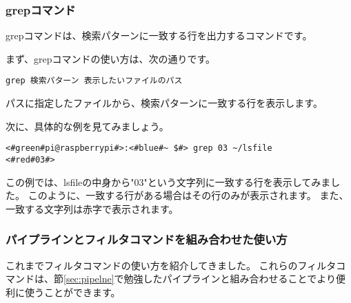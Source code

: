 \begin{tcolorbox}[title=\useOmetoi]
    \begin{enumerate}
    \end{enumerate}
\end{tcolorbox}

\subsubsection{grepコマンド}
grepコマンドは、検索パターンに一致する行を出力するコマンドです。

まず、grepコマンドの使い方は、次の通りです。

\begin{lstlisting}[caption=grepコマンドの使い方, label=grep_usage]
grep 検索パターン 表示したいファイルのパス
\end{lstlisting}

パスに指定したファイルから、検索パターンに一致する行を表示します。

次に、具体的な例を見てみましょう。

\begin{lstlisting}[caption=grepコマンドの実行例, label=grep_example]
<#green#pi@raspberrypi#>:<#blue#~ $#> grep 03 ~/lsfile
<#red#03#>
\end{lstlisting}

この例では、lsfileの中身から"03"という文字列に一致する行を表示してみました。
このように、一致する行がある場合はその行のみが表示されます。
また、一致する文字列は赤字で表示されます。

\begin{tcolorbox}[title=\useOmetoi]
    \begin{enumerate}
    \end{enumerate}
\end{tcolorbox}

\subsubsection{パイプラインとフィルタコマンドを組み合わせた使い方}
これまでフィルタコマンドの使い方を紹介してきました。
これらのフィルタコマンドは、節\ref{sec:pipelne}で勉強したパイプラインと組み合わせることでより便利に使うことができます。

